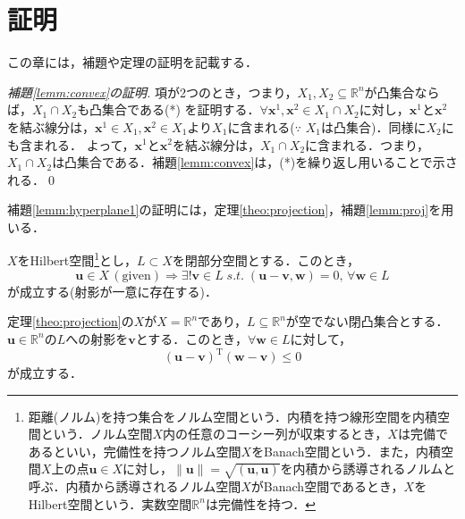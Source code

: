 \documentclass[dvipdfmx]{jsreport}
\begin{document}
\chapter{証明}
この章には，補題や定理の証明を記載する．

\begin{proof}[補題\ref{lemm:convex}の証明]
  項が2つのとき，つまり，$X_1, X_2 \subseteq \mathbb{R}^n$が凸集合ならば，$X_1 \cap X_2$も凸集合である(*)
  を証明する．$\forall \bm{x}^1, \bm{x}^2 \in X_1 \cap X_2$に対し，$\bm{x}^1$と$\bm{x}^2$を結ぶ線分は，$\bm{x}^1 \in X_1, \bm{x}^2 \in X_1$より$X_1$に含まれる($\because$ $X_1$は凸集合)．同様に$X_2$にも含まれる．
  よって，$\bm{x}^1$と$\bm{x}^2$を結ぶ線分は，$X_1 \cap X_2$に含まれる．つまり，$X_1 \cap X_2$は凸集合である．補題\ref{lemm:convex}は，(*)を繰り返し用いることで示される．\qed
\end{proof}

補題\ref{lemm:hyperplane1}の証明には，定理\ref{theo:projection}，補題\ref{lemm:proj}を用いる．

\begin{theo}[射影定理]\label{theo:projection}
  $X$をHilbert空間\footnote{距離(ノルム)を持つ集合をノルム空間という．内積を持つ線形空間を内積空間という．ノルム空間$X$内の任意のコーシー列が収束するとき，$X$は完備であるといい，完備性を持つノルム空間$X$をBanach空間という．また，内積空間$X$上の点$\bm{u} \in X$に対し，$\|\bm{u}\| = \sqrt{(\bm{u}, \bm{u})}$を内積から誘導されるノルムと呼ぶ．内積から誘導されるノルム空間$X$がBanach空間であるとき，$X$をHilbert空間という．実数空間$\mathbb{R}^n$は完備性を持つ．}とし，$L \subset X$を閉部分空間とする．このとき，
  \begin{equation}
    \bm{u} \in X \, (\mathrm{given}) \Rightarrow \exists! \bm{v} \in L \; s.t. \; (\bm{u} - \bm{v}, \bm{w}) = 0, \, \forall \bm{w} \in L \nonumber
  \end{equation}
  が成立する(射影が一意に存在する)．
\end{theo}

\begin{lemm}\label{lemm:proj}
    定理\ref{theo:projection}の$X$が$X = \mathbb{R}^n$であり，$L \subseteq \mathbb{R}^n$が空でない閉凸集合とする．$\bm{u} \in \mathbb{R}^n$の$L$への射影を$\bm{v}$とする．このとき，$\forall \bm{w} \in L$に対して，
  \begin{equation}\label{eq:proj}
    (\bm{u} - \bm{v})^{\mathrm{T}} (\bm{w} - \bm{v}) \leq 0
  \end{equation}
  が成立する．
\end{lemm}
\end{document}
